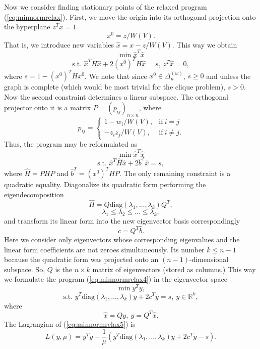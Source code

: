 \documentclass[11pt]{article}
\begin{document}
Now we consider finding stationary points of the relaxed program
(\ref{eq:minnormrelax}). First, we move the origin into its orthogonal
projection onto the hyperplane \mbox{$z^T x = 1$}.
\begin{equation}
\label{eq:x0}
x^0=z/W(V).
\end{equation}
That is, we introduce new variables \mbox{$\hat{x} = x - z/W(V)$}. This way
we obtain
\[ \min \hat{x}^T \hat{x} \]
\[ \mbox{s.t. } \hat{x}^T H \hat{x} + 2 (x^0)^T H \hat{x} = s, \ z^T \hat{x} = 0, \]
where $s = 1 - (x^0)^T H x^0$. We note that since $x^0 \in \Delta^{(w)}_n$,
$s \geq 0$ and unless the graph is complete (which would be most trivial for
the clique problem), $s>0$. Now the second constraint determines a linear
subspace. The orthogonal projector onto it is a matrix
$P=(p_{ij})_{n \times n}$, where
\[ p_{ij} = \left\{ \begin{array}{rl}
      1-w_i/W(V), & \textrm{if} \ i=j \\
  - z_i z_j/W(V), & \textrm{if} \ i \neq j.
\end{array} \right. \]
Thus, the program may be reformulated as
\begin{equation}
\label{eq:minnormrelax4}
\min \hat{x}^T \hat{x}
\end{equation}
\[ \mbox{s.t. } \hat{x}^T \hat{H} \hat{x} + 2 \hat{b}^T \hat{x} = s, \]
where $\hat{H}=PHP$ and $\hat{b}^T=(x^0)^T HP$. The only remaining
constraint is a quadratic equality. Diagonalize its quadratic form performing
the eigendecomposition
\[ \hat{H} = Q \textrm{diag}(\lambda_1, \ldots, \lambda_k) Q^T, \]
\[ \lambda_1 \leq \lambda_2 \leq \ldots \leq \lambda_k, \]
and transform its linear form into the new eigenvector basis correspondingly
\[ c = Q^T \hat{b}. \]
Here we consider only eigenvectors whose corresponding eigenvalues and
the linear form coefficients are not zeroes simultaneously. Its number
$k \leq n-1$ because the quadratic form was projected onto an
$(n-1)$-dimensional subspace. So, $Q$ is the $n \times k$ matrix of
eigenvectors (stored as columns.) This way we formulate the program
(\ref{eq:minnormrelax4}) in the eigenvector space
\begin{equation}
\label{eq:minnormrelax5}
\min y^T y,
\end{equation}
\[ \mbox{s.t. } y^T \textrm{diag}(\lambda_1, \ldots, \lambda_k) y + 2 c^T y = s, \ y \in \mathbb{R}^k, \]
where
\[ \hat{x} = Qy, \ y = Q^T \hat{x}. \]
The Lagrangian of (\ref{eq:minnormrelax5}) is
\[ L(y,\mu) = y^T y - \frac{1}{\mu} (y^T \textrm{diag}(\lambda_1, \ldots, \lambda_k) y + 2 c^T y - s). \]
\end{document}
